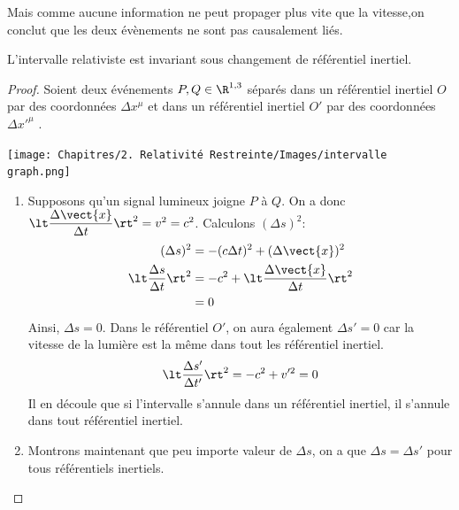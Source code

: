 Mais comme aucune information ne peut propager plus vite que la vitesse,on conclut que les deux évènements ne sont pas causalement liés. 

\begin{theoremframe}
    \begin{propri}
        L'intervalle relativiste est invariant sous changement de référentiel inertiel.
    \end{propri}
\end{theoremframe}
\begin{proof}
    Soient deux événements $P,Q \in \R^{1,3}$ séparés dans un référentiel inertiel $O$ par des coordonnées $\Delta x^{\mu}$ et dans un référentiel inertiel $O'$ par des coordonnées $\Delta x'^{\mu}$ .

    \begin{center}
        \texttt{[image: Chapitres/2. Relativité Restreinte/Images/intervalle graph.png]}
    \end{center}
    \begin{enumerate}
        \item Supposons qu'un signal lumineux joigne $P$ à $Q$. On a donc $\lt \dfrac{\Delta \vect{x}}{\Delta t} \rt^2 = v^2 = c^2$. Calculons $(\Delta s )^2$:
        \begin{align}
            (\Delta s )^2  & = -(c\Delta t)^2 + (\Delta \vect{x})^2\\
            \lt\frac{\Delta s}{\Delta t}\rt^2 & = -c^2 + \lt \frac{\Delta \vect{x}}{\Delta t} \rt^2\\
            & =0
        \end{align}
        Ainsi, $\Delta s = 0$. Dans le référentiel $O'$, on aura également $\Delta s' = 0$  car la vitesse de la lumière est la même dans tout les référentiel inertiel.
        \begin{equation}
            \lt \frac{\Delta s'}{\Delta t'} \rt^2 = -c^2 + v'^2 = 0
        \end{equation}
        Il en découle que si l'intervalle s'annule dans un référentiel inertiel, il s'annule dans tout référentiel inertiel. \\
        \item Montrons maintenant que peu importe valeur de $\Delta s$, on a que $\Delta s = \Delta s' $ pour tous référentiels inertiels.


\end{enumerate}
\end{proof}
